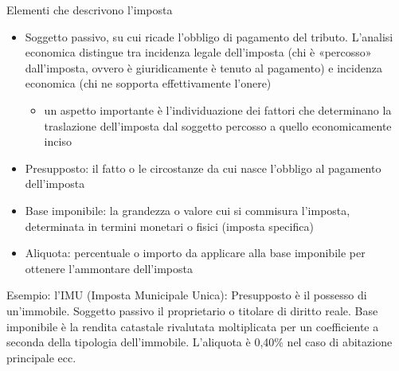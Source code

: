 \documentclass[aspectratio=64,11pt]{beamer}
\begin{document}
\begin{frame}{Elementi che descrivono l'imposta}
\begin{itemize}
\item \alert{Soggetto passivo}, su cui ricade l'obbligo di pagamento del
tributo. L'analisi economica distingue tra \alert{incidenza legale} dell'imposta
(chi è «percosso» dall'imposta, ovvero è giuridicamente è tenuto al pagamento) e \alert{incidenza economica} (chi ne sopporta effettivamente l'onere)
\begin{itemize}
\item un aspetto importante è l'individuazione dei fattori che determinano la
\alert{traslazione} dell'imposta dal soggetto percosso a quello
economicamente inciso
\end{itemize}
\item \alert{Presupposto}: il fatto o le circostanze da cui nasce l'obbligo al pagamento
dell'imposta
\item \alert{Base imponibile}: la grandezza o valore cui si commisura l'imposta, determinata in termini monetari o fisici (imposta \alert{specifica})
\item \alert{Aliquota}: percentuale o importo da applicare alla base imponibile per
ottenere l'ammontare dell'imposta
\end{itemize}

\footnotesize
\begin{block}{}
\alert{Esempio: l'IMU (Imposta Municipale Unica):} Presupposto è il possesso di un'immobile. Soggetto passivo il proprietario o
titolare di diritto reale. Base imponibile è la rendita catastale rivalutata
moltiplicata per un coefficiente a seconda della tipologia
dell'immobile. L'aliquota è 0,40\% nel caso di abitazione principale ecc.
\end{block}
\end{frame}
\end{document}
